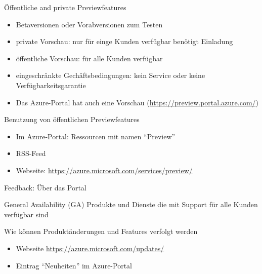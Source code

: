 
\begin{flashcard}[Definition]{Öffentliche and private Previewfeatures}
    \begin{itemize}
        \item Betaversionen oder Vorabversionen zum Testen
        \item private Vorschau: nur für einge Kunden verfügbar\newline
        benötigt Einladung
        \item öffentliche Vorschau: für alle Kunden verfügbar
        \item eingeschränkte Gechäftsbedingungen: kein Service oder keine Verfügbarkeitsgarantie
        \item Das Azure-Portal hat auch eine Vorschau\newline
        (\href{https://preview.portal.azure.com/}{https://preview.portal.azure.com/})
    \end{itemize}
\end{flashcard}

\begin{flashcard}[\ ]{Benutzung von öffentlichen Previewfeatures}
    \begin{itemize}
        \item Im Azure-Portal: Ressourcen mit namen ``Preview''
        \item RSS-Feed
        \item Webseite: \href{https://azure.microsoft.com/services/preview/}{https://azure.microsoft.com/services/preview/}
    \end{itemize}

    \vspace{5mm}
    Feedback: Über das Portal
\end{flashcard}

\begin{flashcard}[Definition]{General Availability (GA)}
    Produkte und Dienste die mit Support für alle Kunden verfügbar sind
\end{flashcard}

\begin{flashcard}[\ ]{Wie können Produktänderungen und Features verfolgt werden}
    \begin{itemize}
        \item Webseite \href{https://azure.microsoft.com/updates/}{https://azure.microsoft.com/updates/}
        \item Eintrag ``Neuheiten'' im Azure-Portal
    \end{itemize}

\end{flashcard}
